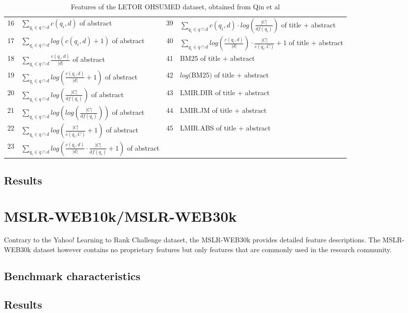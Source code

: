 \begin{table}[!h]
{\begin{tabular}{p{0.29cm}|p{6.88cm}||p{0.29cm}|p{6.90cm}}
16& $\sum\nolimits_{q_i \in q \cap d}c(q_i, d)$ of abstract		& 39& $\sum\nolimits_{q_i \in q \cap d}c(q_i,d)\cdot log(\frac{|C|}{df(q_i)})$ of title + abstract\\
17& $\sum\nolimits_{q_i \in q \cap d}log(c(q_i, d)+1)$ of abstract		& 40& $\sum\nolimits_{q_i \in q \cap d} log(\frac{c(q_i,d)}{|d|}) \cdot \frac{|C|}{c(q_i,C)}+1$ of title + abstract\\
18& $\sum\nolimits_{q_i \in q \cap d}\frac{c(q_i,d)}{|d|}$ of abstract		& 41& BM25 of title + abstract\\
19& $\sum\nolimits_{q_i \in q \cap d}log(\frac{c(q_i,d)}{|d|}+1)$ of abstract		& 42& $log($BM25$)$ of title + abstract\\
20& $\sum\nolimits_{q_i \in q \cap d}log(\frac{|C|}{df(q_i)})$ of abstract	& 43& LMIR.DIR of title + abstract\\

21& $\sum\nolimits_{q_i \in q \cap d}log(log(\frac{|C|}{df(q_i)}))$ of abstract					& 44& LMIR.JM of title + abstract\\
22&  $\sum\nolimits_{q_i \in q \cap d}log(\frac{|C|}{c(q_i,C)}+1)$ of abstract					& 45& LMIR.ABS of title + abstract\\
23& $\sum\nolimits_{q_i \in q \cap d}log(\frac{c(q_i,d)}{|d|} \cdot \frac{|C|}{df(q_i)}+1)$ of abstract					& & \\
\end{tabular}
}
\caption{Features of the LETOR OHSUMED dataset, obtained from Qin et al\cite{Qin2010}}
\label{tbl:features_ohsumed}
\end{table}
\section{Results}



\chapter{MSLR-WEB10k/MSLR-WEB30k}
Contrary to the Yahoo! Learning to Rank Challenge dataset, the MSLR-WEB30k provides detailed feature descriptions. The MSLR-WEB30k dataset however contains no proprietary features but only features that are commonly used in the research community.
\section{Benchmark characteristics}
\section{Results}

